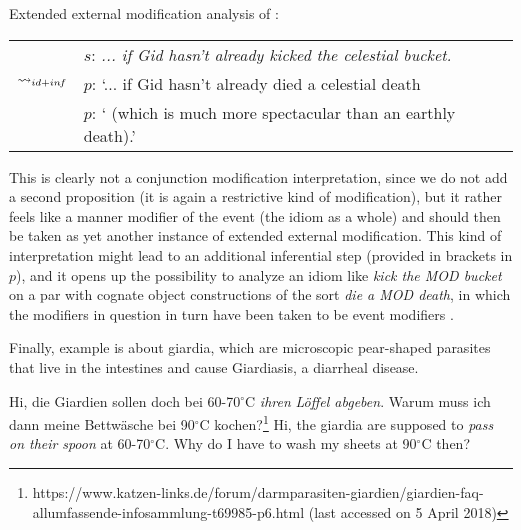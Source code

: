 \documentclass[output=paper]{langsci/langscibook}
\begin{document}
\ea \label{analysis3 celestial bucket} Extended external modification analysis of : \\
\vspace{5pt}
\begin{tabular}{ll}
									& 	$s$: \hspace{4pt} \textit{... if Gid hasn't already kicked the celestial bucket.} \\
$\rightsquigarrow_{id+in\hspace{-0.8pt} f}$	&	$p$: \hspace{1pt} `... if Gid hasn't already died a celestial death \\
									&	{\white $p$: `} (which is much more spectacular than an earthly death).' 
\end{tabular}
\z

\noindent This is clearly not a conjunction modification interpretation, since we do not add a second proposition (it is again a restrictive kind of modification), but it rather feels like a manner modifier of the event (the idiom as a whole) and should then be taken as yet another instance of extended external modification. This kind of interpretation might lead to an additional inferential step (provided in brackets in $p$), and it opens up the possibility to analyze an idiom like \textit{kick the MOD bucket} on a par with cognate object constructions of the sort \textit{die a MOD death}, in which the modifiers in question in turn have been taken to be event modifiers \citep[see, e.g.,][]{mittwoch98, sailer10}.

Finally, example  is about giardia, which are microscopic pear-shaped parasites that live in the intestines and cause Giardiasis, a diarrheal disease.

\ea \label{pear-shaped spoon}
Hi, die Giardien sollen doch bei 60-70$^\circ$C \textit{ihren} \underline{} \textit{Löffel abgeben}. Warum muss ich dann meine Bettwäsche bei 90$^\circ$C kochen?\footnote{https://www.katzen-links.de/forum/darmparasiten-giardien/giardien-faq-allumfassende-infosammlung-t69985-p6.html (last accessed on 5 April 2018)}
\vspace{5pt}
\glt Hi, the giardia are supposed to \textit{pass on their} \underline{} \textit{spoon} at \mbox{60-70$^\circ$C}. Why do I have to wash my sheets at 90$^\circ$C then?
\z
\end{document}
